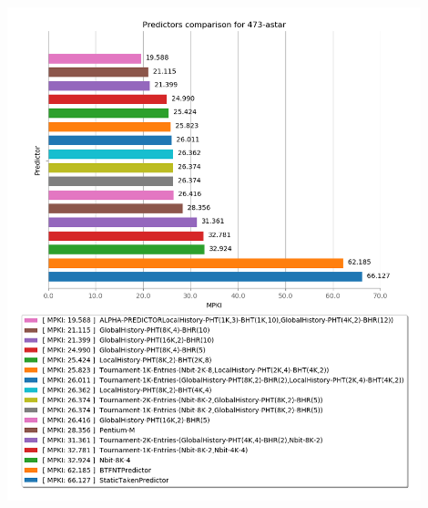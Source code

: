    \begin{minipage}{\textwidth}
      \begin{center}
         \\
         \vspace{3mm}
         \includegraphics[width=0.9\textwidth, frame]{./graphs/4-5/473-astar.png}
         \vspace{6mm}
      \end{center}
   \end{minipage}


